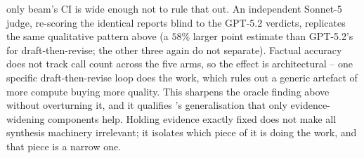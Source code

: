 \documentclass[11pt]{article}
\begin{document}
only beam's CI is wide enough not to rule that out. An independent
Sonnet-5 judge, re-scoring the identical reports blind to the GPT-5.2 verdicts, replicates
the same qualitative pattern above (a $58\%$ larger point estimate than GPT-5.2's for
draft-then-revise; the other three again do not separate). Factual
accuracy does not track call count across the five arms, so the effect is
architectural -- one specific draft-then-revise loop does the work, which rules out a generic
artefact of more compute buying more quality. This sharpens the oracle finding above without overturning it,
and it qualifies 's generalisation that only evidence-widening components
help. Holding evidence exactly fixed does not make all synthesis machinery irrelevant; it
isolates which piece of it is doing the work, and that piece is a narrow one.
\end{document}
